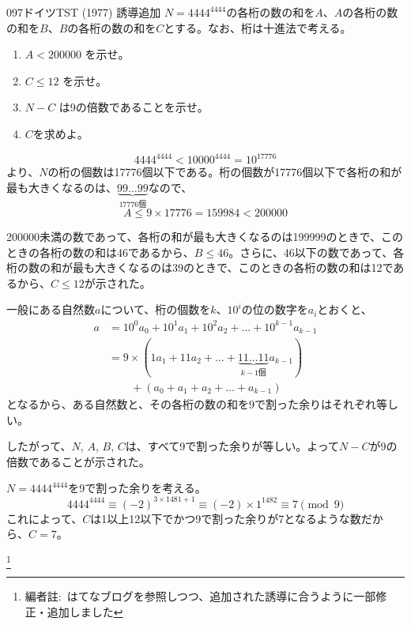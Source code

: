 \begin{thm}{097}{}{ドイツTST (1977) 誘導追加}
 $N=4444^{4444}$の各桁の数の和を$A$、$A$の各桁の数の和を$B$、$B$の各桁の数の和を$C$とする。なお、桁は十進法で考える。
 \begin{enumerate}
  \item $A<200000$ を示せ。
  \item $C\le 12$ を示せ。
  \item $N-C$ は9の倍数であることを示せ。
  \item $C$を求めよ。
 \end{enumerate}
\end{thm}

\[ 4444^{4444}<10000^{4444}=10^{17776} \]
より、$N$の桁の個数は17776個以下である。桁の個数が17776個以下で各桁の和が最も大きくなるのは、$\underbrace{99\dots 99}_{17776\text{個}}$なので、
\[ A\le 9\times 17776 = 159984 < 200000 \]

200000未満の数であって、各桁の和が最も大きくなるのは199999のときで、このときの各桁の数の和は46であるから、$B\le 46$。さらに、46以下の数であって、各桁の数の和が最も大きくなるのは39のときで、このときの各桁の数の和は12であるから、$C\le 12$が示された。

一般にある自然数$a$について、桁の個数を$k$、$10^i$の位の数字を$a_i$とおくと、
\begin{align*}
 a&=10^0a_0+10^1a_1+10^2a_2+\dots+10^{k-1}a_{k-1} \\
 &=9\times(1a_1+11a_2+\dots+\underbrace{11\dots 11}_{k-1\text{個}}a_{k-1}) \\
 &\qquad + (a_0+a_1+a_2+\dots+a_{k-1})
\end{align*}
となるから、ある自然数と、その各桁の数の和を9で割った余りはそれぞれ等しい。

したがって、$N$, $A$, $B$, $C$は、すべて9で割った余りが等しい。よって$N-C$が9の倍数であることが示された。

$N=4444^{4444}$を9で割った余りを考える。
\[ 4444^{4444} \equiv (-2)^{3\times 1481+1} \equiv (-2)\times 1^{1482} \equiv 7 \pmod{9} \]
これによって、$C$は1以上12以下でかつ9で割った余りが7となるような数だから、$C=7$。

\footnote{編者註:~はてなブログを参照しつつ、追加された誘導に合うように一部修正・追加しました}